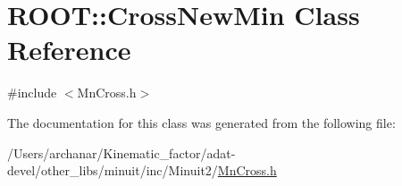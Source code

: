 \hypertarget{classROOT_1_1Minuit2_1_1MnCross_1_1CrossNewMin}{}\section{R\+O\+OT\+:\+:Cross\+New\+Min Class Reference}
\label{classROOT_1_1Minuit2_1_1MnCross_1_1CrossNewMin}


{\ttfamily \#include $<$Mn\+Cross.\+h$>$}



The documentation for this class was generated from the following file\+:\begin{DoxyCompactItemize}
\item 
/\+Users/archanar/\+Kinematic\+\_\+factor/adat-\/devel/other\+\_\+libs/minuit/inc/\+Minuit2/\mbox{\hyperlink{adat-devel_2other__libs_2minuit_2inc_2Minuit2_2MnCross_8h}{Mn\+Cross.\+h}}\end{DoxyCompactItemize}
